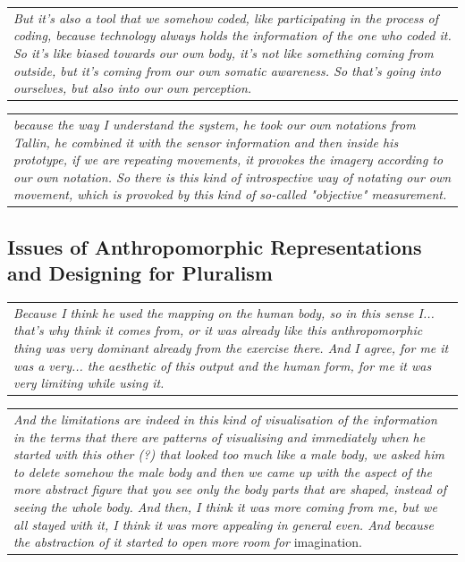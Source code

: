 \begin{center}
\begin{tabular}{ p{13cm}}
\textit{But it's also a tool that we somehow coded, like participating in the process of coding, because technology always holds the information of the one who coded it. So it's like biased towards our own body, it's not like something coming from outside, but it's coming from our own somatic awareness. So that's going into ourselves, but also into our own perception.}
\end{tabular}
\end{center}

\begin{center}
\begin{tabular}{ p{13cm}}
\textit{because the way I understand the system, he took our own notations from Tallin, he combined it with the sensor information and then inside his prototype, if we are repeating movements, it provokes the imagery according to our own notation. So there is this kind of introspective way of notating our own movement, which is provoked by this kind of so-called "objective" measurement.}
\end{tabular}
\end{center}

\subsection*{Issues of Anthropomorphic Representations and Designing for Pluralism}

\begin{center}
\begin{tabular}{ p{13cm}}
\textit{Because I think he used the mapping on the human body, so in this sense I... that's why  think it comes from, or it was already like this anthropomorphic thing was very dominant already from the exercise there. And I agree, for me it was a very... the aesthetic of this output and the human form, for me it was very limiting while using it.}
\end{tabular}
\end{center}

\begin{center}
\begin{tabular}{ p{13cm}}
\textit{And the limitations are indeed in this kind of visualisation of the information in the terms that there are patterns of visualising and immediately when he started with this other (?) that looked too much like a male body, we asked him to delete somehow the male body and then we came up with the aspect of the more abstract figure that you see only the body parts that are shaped, instead of seeing the whole body. And then, I think it was more coming from me, but we all stayed with it, I think it was more appealing in general even. And because the abstraction of it started to open more room for} imagination.
\end{tabular}
\end{center}

